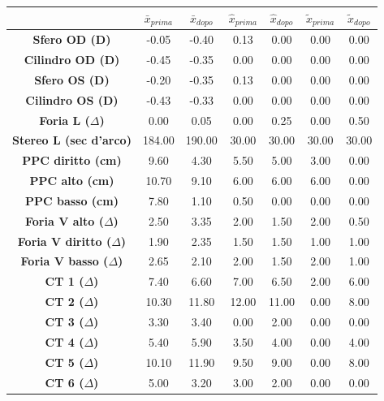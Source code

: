 \begin{table}[H]
\begin{center}
\begin{tabular}{|c|c|c|c|c|c|c|} \hline
{\textbf{}} & {\textbf{$\bar{x}_{prima}$}}} & {\textbf{$\bar{x}_{dopo}$}}& {\textbf{$\hat{x}_{prima}$}}} & {\textbf{$\hat{x}_{dopo}$}}} & {\textbf{$\tilde{x}_{prima}$}}} & {\textbf{$\tilde{x}_{dopo}$}}}\\ \hline
\textbf{Sfero OD (D)} & -0.05 & -0.40 & 0.13 & 0.00 & 0.00 & 0.00 \\ \hline
\textbf{Cilindro OD (D)} & -0.45 & -0.35 & 0.00 & 0.00 & 0.00 & 0.00 \\ \hline
\textbf{Sfero OS (D)} & -0.20 & -0.35 & 0.13 & 0.00 & 0.00 & 0.00 \\ \hline
\textbf{Cilindro OS (D)} & -0.43 & -0.33 & 0.00 & 0.00 & 0.00 & 0.00 \\ \hline
\textbf{Foria L ($\Delta$)} & 0.00 & 0.05 & 0.00 & 0.25 & 0.00 & 0.50 \\ \hline
\textbf{Stereo L (sec d'arco)} & 184.00 & 190.00 & 30.00 & 30.00 & 30.00 & 30.00 \\ \hline
\textbf{PPC diritto (cm)} & 9.60 & 4.30 & 5.50 & 5.00 & 3.00 & 0.00 \\ \hline
\textbf{PPC alto (cm)} & 10.70 & 9.10 & 6.00 & 6.00 & 6.00 & 0.00\\ \hline
\textbf{PPC basso (cm)} & 7.80 & 1.10 & 0.50 & 0.00 & 0.00 & 0.00 \\ \hline
\textbf{Foria V alto ($\Delta$)} & 2.50 & 3.35 & 2.00 & 1.50 & 2.00 & 0.50 \\ \hline
\textbf{Foria V diritto ($\Delta$)} & 1.90 & 2.35 & 1.50 & 1.50 & 1.00 & 1.00 \\ \hline
\textbf{Foria V basso ($\Delta$)} & 2.65 & 2.10 & 2.00 & 1.50 & 2.00 & 1.00 \\ \hline
\textbf{CT 1 ($\Delta$)} & 7.40 & 6.60 & 7.00 & 6.50 & 2.00 & 6.00 \\ \hline
\textbf{CT 2 ($\Delta$)} & 10.30 & 11.80 & 12.00 & 11.00 & 0.00 & 8.00\\ \hline
\textbf{CT 3 ($\Delta$)} & 3.30 & 3.40 & 0.00 & 2.00 & 0.00 & 0.00 \\ \hline
\textbf{CT 4 ($\Delta$)} & 5.40 & 5.90 & 3.50 & 4.00 & 0.00 & 4.00 \\ \hline
\textbf{CT 5 ($\Delta$)} & 10.10 & 11.90 & 9.50 & 9.00 & 0.00 & 8.00 \\ \hline
\textbf{CT 6 ($\Delta$)} & 5.00 & 3.20 & 3.00 & 2.00 & 0.00 & 0.00 \\ \hline

\end{tabular}
\end{center}
\end{table}
